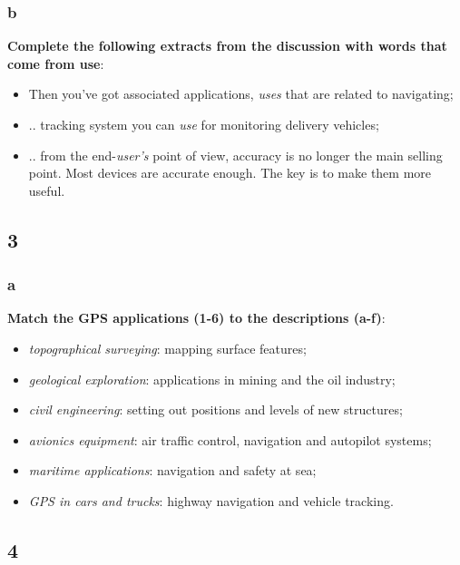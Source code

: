 \subsubsection{b}

\textbf{Complete the following extracts from the discussion with words that come from use}:

\begin{itemize}
\item Then you've got associated applications, \textit{uses} that are related to navigating;
\item .. tracking system you can \textit{use} for monitoring delivery vehicles;
\item .. from the end-\textit{user's} point of view, accuracy is no longer the main selling point. Most devices are accurate enough. The key is to make them more useful.
\end{itemize}

\subsection{3}

\subsubsection{a}

\textbf{Match the GPS applications (1-6) to the descriptions (a-f)}:

\begin{itemize}

\item \textit{topographical surveying}: mapping surface features;
\item \textit{geological exploration}: applications in mining and the oil industry;
\item \textit{civil engineering}: setting out positions and levels of new structures;
\item \textit{avionics equipment}: air traffic control, navigation and autopilot systems;
\item \textit{maritime applications}: navigation and safety at sea;
\item \textit{GPS in cars and trucks}: highway navigation and vehicle tracking.

\end{itemize}

\subsection{4}

